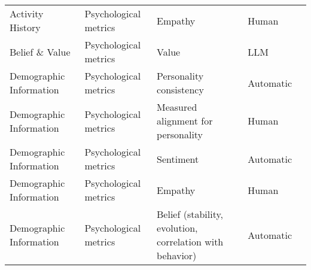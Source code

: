 \begin{small}
\begin{center}
\begin{longtable}{@{}p{}p{}p{}p{}p{}@{}}
Activity History        & Psychological metrics & Empathy                                                                                                                                     & Human             & \cite{10.1145/3613904.3642363}                                                                                                                \\
Belief \& Value        & Psychological metrics & Value                                                                                                                                       & LLM               & \cite{shao2023character}                                                                                                              \\
Demographic Information & Psychological metrics & Personality consistency                                                                                                                     & Automatic         & \cite{wang2024incharacter}                                                                                                                        \\
Demographic Information & Psychological metrics & Measured alignment for personality                                                                                                          & Human             & \cite{wang2024incharacter}                                                                                                                   \\
Demographic Information & Psychological metrics & Sentiment                                                                                                                                   & Automatic         & \cite{fang2024llm}                                                                                                                               \\
Demographic Information & Psychological metrics & Empathy                                                                                                                                     & Human             & \cite{10.1145/3613904.3642363}                                                                                                                \\
Demographic Information & Psychological metrics & Belief (stability, evolution, correlation with behavior)                                                                                    & Automatic         & \cite{lei2024fairmindsim}                                                                                                                             \\

\end{longtable}
\end{center}
\end{small}
